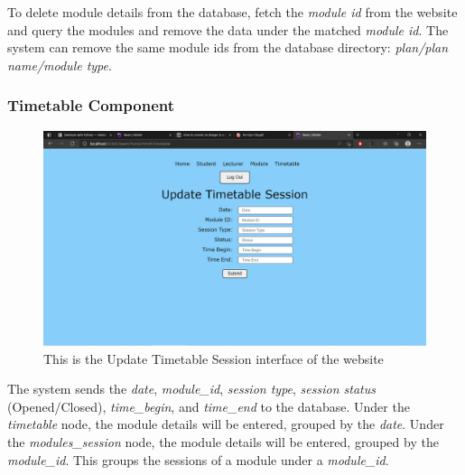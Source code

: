 \documentclass[../report.tex]{subfiles}
\begin{document}


To delete module details from the database, fetch the \textit{module id} from the website and query the modules and remove the data under the matched \textit{module id}. The system can remove the same module ids from the database directory: \textit{plan/plan name/module type}. 

\medskip
\subsubsection{Timetable Component}
\begin{figure}[H]
	\centering
	\includegraphics[width=.7\linewidth]{../images/07/01-06-timetable.png}
	\caption{This is the Update Timetable Session interface of the website}
	\label{fig:07-01-06-timetable}
\end{figure}



The system sends the \textit{date}, \textit{module\_id}, \textit{session type}, \textit{session status} (Opened/Closed), \textit{time\_begin}, and \textit{time\_end} to the database. Under the \textit{timetable} node, the module details will be entered, grouped by the \textit{date}. Under the \textit{modules\_session} node, the module details will be entered, grouped by the \textit{module\_id}. This groups the sessions of a module under a \textit{module\_id}.

\medskip
\end{document}
